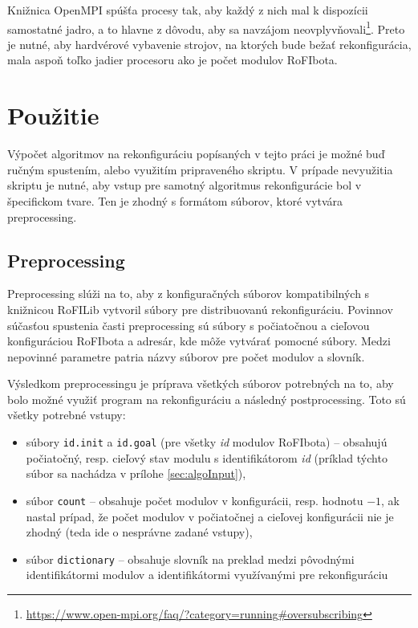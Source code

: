 \documentclass[
  digital, %
  oneside, %
  notable,   %
  lof,     %
  nolot,     %
]{fithesis3}
\begin{document}
Knižnica OpenMPI spúšťa procesy tak, aby každý z nich mal k dispozícii samostatné jadro, a to hlavne z dôvodu, aby sa navzájom neovplyvňovali\footnote{\url{https://www.open-mpi.org/faq/?category=running\#oversubscribing}}. Preto je nutné, aby hardvérové vybavenie strojov, na ktorých bude bežať rekonfigurácia, mala aspoň toľko jadier procesoru ako je počet modulov RoFIbota. 

\section{Použitie}
Výpočet algoritmov na rekonfiguráciu popísaných v tejto práci je možné buď ručným spustením, alebo využitím pripraveného skriptu. V prípade nevyužitia skriptu je nutné, aby vstup pre samotný algoritmus rekonfigurácie bol v špecifickom tvare. Ten je zhodný s formátom súborov, ktoré vytvára preprocessing.

\subsection{Preprocessing}
Preprocessing slúži na to, aby z konfiguračných súborov kompatibilných s knižnicou RoFILib vytvoril súbory pre distribuovanú rekonfiguráciu. Povinnov súčasťou spustenia časti preprocessing sú súbory s počiatočnou a cieľovou konfiguráciou RoFIbota a adresár, kde môže vytvárať pomocné súbory. Medzi nepovinné parametre patria názvy súborov pre počet modulov a slovník. 

Výsledkom preprocessingu je príprava všetkých súborov potrebných na to, aby bolo možné využiť program na rekonfiguráciu a následný postprocessing. Toto sú všetky potrebné vstupy: 
\begin{itemize}
    \item súbory \texttt{id.init} a \texttt{id.goal} (pre všetky \textit{id} modulov RoFIbota) -- obsahujú počiatočný, resp. cieľový stav modulu s identifikátorom \textit{id} (príklad týchto súbor sa nachádza v prílohe \ref{sec:algoInput}), 
    \item súbor \texttt{count} -- obsahuje počet modulov v konfigurácii, resp. hodnotu $-1$, ak nastal prípad, že počet modulov v počiatočnej a cieľovej konfigurácii nie je zhodný (teda ide o nesprávne zadané vstupy), 
    \item súbor \texttt{dictionary} -- obsahuje slovník na preklad medzi pôvodnými identifikátormi modulov a identifikátormi využívanými pre rekonfiguráciu
\end{itemize}
\end{document}
